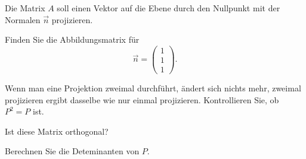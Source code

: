 Die Matrix $A$ soll einen Vektor auf die Ebene durch den
Nullpunkt mit der Normalen $\vec n$ projizieren.
\begin{teilaufgaben}
\item
Finden Sie die Abbildungsmatrix für
\[
\vec n=\begin{pmatrix}1\\1\\1\end{pmatrix}.
\]
\item
Wenn man eine Projektion zweimal durchführt, ändert sich nichts mehr,
zweimal projizieren ergibt dasselbe wie nur einmal projizieren.
Kontrollieren Sie, ob $P^2=P$ ist.
\item
Ist diese Matrix orthogonal?
\item
Berechnen Sie die Deteminanten von $P$.
\end{teilaufgaben}


